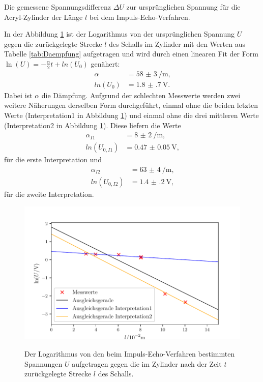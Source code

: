 \begin{table}
	\centering
	\caption{Die gemessene Spannungsdifferenz $\Delta U$ zur ursprünglichen Spannung für die Acryl-Zylinder der Länge $l$ bei dem Impuls-Echo-Verfahren.}
	
	\label{tab:Daempfung}
\end{table}

\noindent In der Abbildung \ref{fig:Daempfung} ist der Logarithmus von der ursprünglichen Spannung $U$ gegen die zurückgelegte Strecke $l$ des Schalls im Zylinder mit den Werten aus Tabelle \ref{tab:Daempfung} aufgetragen und wird durch einen linearen Fit der Form $\ln(U)=-\frac{\alpha}{2} t + ln(U_0)$ genähert:
\begin{align*}
	\alpha	&= \SI{58(3)}{\per\meter}\text{,}\\
	ln(U_0)	&=\SI{1.8(7)}{\volt}\text{.}
\end{align*}
Dabei ist $\alpha$ die Dämpfung.
Aufgrund der schlechten Messwerte werden zwei weitere Näherungen derselben Form durchgeführt, einmal ohne die beiden letzten Werte (Interpretation1 in Abbildung \ref{fig:Daempfung}) und einmal ohne die drei mittleren Werte (Interpretation2 in Abbildung \ref{fig:Daempfung}). Diese liefern die Werte
\begin{align*}
	\alpha_{I1} &= \SI{8(2)}{\per\meter}\text{,}\\
	ln(U_{0,I1})&=\SI{0.47(5)}{\volt}\text{,}
\end{align*} 
für die erste Interpretation und
\begin{align*}
	\alpha_{I2} &= \SI{63(4)}{\per\meter}\text{,}\\
	ln(U_{0,I2})&=\SI{1.4(2)}{\volt}\text{,}
\end{align*}
für die zweite Interpretation.

\begin{figure}
	\centering
	\caption{Der Logarithmus von den beim Impuls-Echo-Verfahren bestimmten Spannungen $U$ aufgetragen gegen die im Zylinder nach der Zeit $t$ zurückgelegte Strecke $l$ des Schalls.}
	\includegraphics[width=\linewidth-70pt,height=\textheight-70pt,keepaspectratio]{content/images/Daempfung.pdf}
	\label{fig:Daempfung}
\end{figure}

